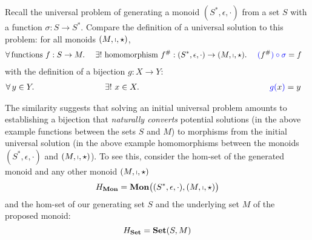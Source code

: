 \begin{remark}
    Recall the universal problem of generating a monoid
    $(S^\ast, \epsilon, \cdot)$ from a set $S$ with a function
    $\sigma: S\to S^\ast$. Compare the definition of a universal solution to
    this problem: for all monoids $(M, \shortmid, \star)$,
    \begin{alignat*}{3}
        & \forall\, \text{functions } f:S\to M.\ &&
        \exists!\ \text{homomorphism }
        f^\#: (S^\ast, \epsilon, \cdot)
        \to
        (M, \shortmid, \star)
        .\ &&
        \textcolor{blue}{(}f^\#\textcolor{blue}{) \circ \sigma} = f
    \end{alignat*}
    with the definition of a bijection $g : X \rightarrow Y$:
    \begin{alignat*}{3}
        &
        \forall\, y \in Y.\
        \hspace*{2.5cm}
        &&
        \exists!\ x \in X.\
        \hspace*{5cm}
        &&
        \textcolor{blue}{g(}x\textcolor{blue}{)} = y
    \end{alignat*}

    The similarity suggests that solving an initial universal problem amounts
    to establishing a bijection that \emph{naturally converts} potential
    solutions (in the above example functions between the sets $S$ and $M$) to
    morphisms from the initial universal solution \big(in the above example
    homomorphisms between the monoids $(S^\ast, \epsilon, \cdot)$ and
    $(M, \shortmid, \star)$\big).
    To see this, consider the hom-set of the generated monoid and any other
    monoid $(M, \shortmid, \star)$
    \begin{equation*}
        H_{\mathbf {Mon}}
        = \mathbf {Mon} \big( (S^*, \epsilon, \cdot), (M, \shortmid, \star) \big)
    \end{equation*}
    and the hom-set of our generating set $S$ and the underlying set $M$ of
    the proposed monoid:
    \begin{equation*}
        H_{\mathbf {Set}} = \mathbf {Set} ( S, M )
    \end{equation*}


\end{remark}
